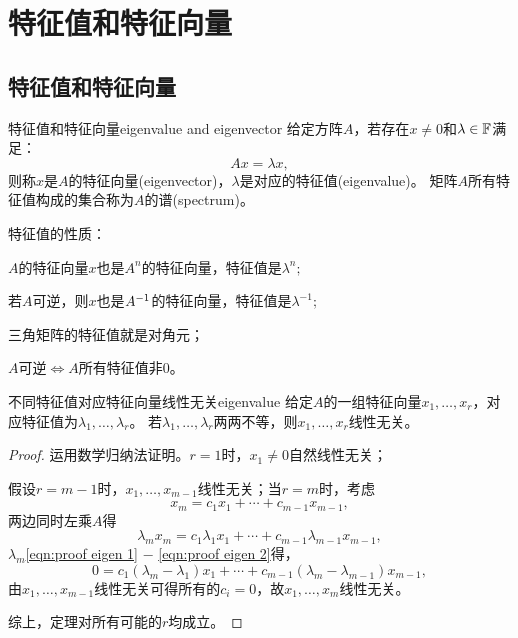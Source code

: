 
\chapter{特征值和特征向量}
\section{特征值和特征向量}
\begin{definition}{特征值和特征向量}{eigenvalue and eigenvector}
	给定方阵$A$，若存在$x\neq 0$和$\lambda\in\mathbb F$满足：
	\[
		Ax=\lambda x,
	\]
	则称$x$是$A$的特征向量(eigenvector)，$\lambda$是对应的特征值(eigenvalue)。
	矩阵$A$所有特征值构成的集合称为$A$的谱(spectrum)。
\end{definition}

\begin{corollary}
	特征值的性质：
	\begin{compactenum}
		\item $A$的特征向量$x$也是$A^n$的特征向量，特征值是$\lambda^n;$
		\item 若$A$可逆，则$x$也是$A^{-1}$的特征向量，特征值是$\lambda^{-1};$
		\item 三角矩阵的特征值就是对角元；
		\item $A$可逆$\iff A$所有特征值非0。
		
	\end{compactenum}
\end{corollary}

\begin{theorem}{不同特征值对应特征向量线性无关}{eigenvalue}
	给定$A$的一组特征向量$x_1,\ldots,x_r$，对应特征值为$\lambda_1,\ldots,\lambda_r$。
	若$\lambda_1,\ldots,\lambda_r$两两不等，则$x_1,\ldots,x_r$线性无关。
\end{theorem}
\begin{proof}
	运用数学归纳法证明。$r=1$时，$x_1\neq 0$自然线性无关；
	
	假设$r=m-1$时，$x_1,\ldots,x_{m-1}$线性无关；当$r=m$时，考虑
	\begin{equation}
		\label{eqn:proof eigen 1}
		x_m=c_1x_1+\cdots+c_{m-1}x_{m-1},\tag{$\ast$}
	\end{equation}
	两边同时左乘$A$得
	\begin{equation}
		\label{eqn:proof eigen 2}
		\lambda_mx_m=c_1\lambda_1x_1+\cdots+c_{m-1}\lambda_{m-1}x_{m-1},\tag{$\ast\ast$}
	\end{equation}
	$\lambda_m$\eqref{eqn:proof eigen 1} $-$ \eqref{eqn:proof eigen 2}得，
	\[
		0=c_1(\lambda_m-\lambda_1)x_1+\cdots+c_{m-1}(\lambda_m-\lambda_{m-1})x_{m-1},
	\]
	由$x_1,\ldots,x_{m-1}$线性无关可得所有的$c_i=0$，故$x_1,\ldots,x_m$线性无关。

	综上，定理对所有可能的$r$均成立。
\end{proof}

